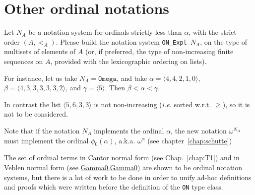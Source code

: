 
\section{Other ordinal notations}









\begin{project}
Let $N_A$ be a notation system for ordinals strictly less than $\alpha$, 
with the strict order $(A,<_A)$. Please build the notation system
\texttt{ON\_Expl $N_A$}, on the type of multisets of elements of $A$
(or, if preferred, the type of non-increasing finite sequences on $A$,
provided with the lexicographic ordering on lists).

For instance, let us take $N_A=\texttt{Omega}$, and take $\alpha=\langle 4,4,2,1,0\rangle$,
 $\beta=\langle 4,3,3,3,3,3,2\rangle$, and $\gamma=\langle 5\rangle$. Then $\beta<\alpha<\gamma$. 

In contrast the list $\langle5,6,3,3\rangle$ is not non-increasing (\emph{i.e.} sorted w.r.t. $\geq$), so it is not to be considered.

Note that if the notation $N_A$ implements the ordinal 
$\alpha$,  the new notation $\omega^{N_A}$ must implement the ordinal $\phi_0(\alpha)$, a.k.a. $\omega^\alpha$ (see chapter~\ref{chap:schutte})

\end{project}



\begin{remark}
 The set of ordinal terms in Cantor normal form (see Chap.~\ref{chap:T1}) and 
in Veblen normal form (see 
\href{../theories/html/hydras.Gamma0.Gamma0.html}{Gamma0.Gamma0}) are shown to be ordinal notation systems, but there is a lot of work to be done in order to unify ad-hoc  definitions and proofs which were written before the definition of the \texttt{ON} type class.
\end{remark}










